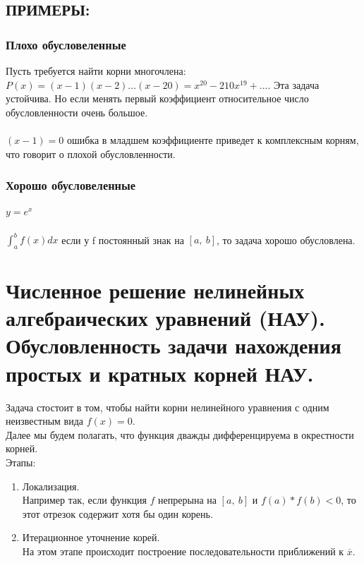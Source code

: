 \documentclass[16pt]{article}
\begin{document}
			\subsection{ПРИМЕРЫ:}
			\subsubsection{Плохо обусловеленные}
			Пусть требуется найти корни многочлена:\\
			$P(x) = (x-1)(x-2)...(x-20)=x^{20} - 210 x^{19} + ... $. Эта задача устойчива. Но если менять первый коэффициент относительное число обусловленности очень большое.\\ \\
			$(x-1)=0$ ошибка в младшем коэффициенте приведет к комплексным корням, что говорит о плохой обусловленности.
			\subsubsection{Хорошо обусловеленные}
			$y = e^x$\\ \\
			$\int_{a}^{b}f(x) dx$ если у f постоянный знак на $[a,\ b]$, то задача хорошо обусловлена. 
			
		\section{Численное решение нелинейных алгебраических уравнений (НАУ). Обусловленность задачи нахождения простых и кратных корней НАУ.}
			Задача стостоит в том, чтобы найти корни нелинейного уравнения с одним неизвестным вида $f(x)=0$.\\
			Далее мы будем полагать, что функция дважды дифференцируема в окрестности корней.\\
			Этапы:\\
			\begin{enumerate}
				\item{
					Локализация.\\
					Например так, если функция $f$ непрерына на $[a,\ b]$ и $f(a)*f(b)<0$, то этот отрезок содержит хотя бы один корень.
				}
				\item{
					Итерационное уточнение корей.\\
					На этом этапе происходит построение последовательности приближений к $\overline{x}$.
				}
			\end{enumerate}
\end{document}
